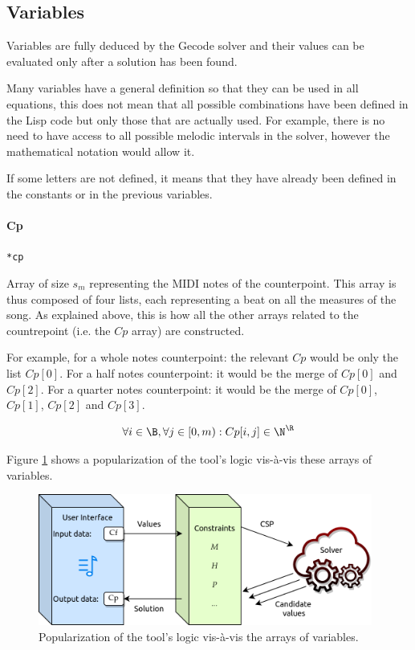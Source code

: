 \subsection{Variables}\label{sec:variables}
Variables are fully deduced by the Gecode solver and their values can be evaluated only after a solution has been found.

Many variables have a general definition so that they can be used in all equations, this does not mean that all possible combinations have been defined in the Lisp code but only those that are actually used. For example, there is no need to have access to all possible melodic intervals in the solver, however the mathematical notation would allow it.

If some letters are not defined, it means that they have already been defined in the constants or in the previous variables.
\paragraph{Cp} \texttt{*cp} %

Array of size $s_{m}$ representing the MIDI notes of the counterpoint. This array is thus composed of four lists, each representing a beat on all the measures of the song. As explained above, this is how all the other arrays related to the countrepoint (i.e. the $Cp$ array) are constructed.

For example, for a whole notes counterpoint: the relevant $Cp$ would be only the list $Cp[0]$. For a half notes counterpoint: it would be the merge of $Cp[0]$ and $Cp[2]$. For a quarter notes counterpoint: it would be the merge of $Cp[0]$, $Cp[1]$, $Cp[2]$ and $Cp[3]$.

\begin{equation}
    \forall i \in \B, \forall j \in [0, m): Cp[i, j]\in \N^{\R}
\end{equation}

Figure \ref{fig:solverdiagram} shows a popularization of the tool's logic vis-à-vis these arrays of variables.

\begin{figure}
    \centering
    \includegraphics[height=1.7in]{Images/solver_diagram.png}
    \caption{Popularization of the tool's logic vis-à-vis the arrays of variables.}
    \label{fig:solverdiagram}
\end{figure}

